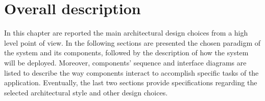 \chapter{Overall description}

In this chapter are reported the main architectural design choices from a high level point of view. In the following sections are presented the chosen paradigm of the system and its components, followed by the description of how the system will be deployed. Moreover, components’ sequence and interface  diagrams are listed to describe the way components interact to accomplish specific tasks of the application. Eventually, the last two sections provide specifications regarding the selected architectural style and other design choices.






